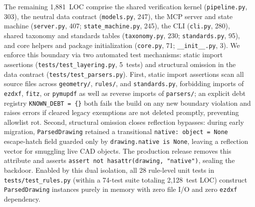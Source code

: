 \documentclass[nocopyright,nolists,upint,varvw,hyphenate]{asmejour}
\begin{document}
The remaining 1,881~LOC comprise the shared verification kernel (\texttt{pipeline.py}, 303), the neutral data contract (\texttt{models.py}, 247), the MCP server and state machine (\texttt{server.py}, 407; \texttt{state\_machine.py}, 245), the CLI (\texttt{cli.py}, 280), shared taxonomy and standards tables (\texttt{taxonomy.py}, 230; \texttt{standards.py}, 95), and core helpers and package initialization (\texttt{core.py}, 71; \texttt{\_\_init\_\_.py}, 3). We enforce this boundary via two automated test mechanisms: static import assertions (\texttt{tests/test\_layering.py}, 5~tests) and structural omission in the data contract (\texttt{tests/test\_parsers.py}). First, static import assertions scan all source files across \texttt{geometry/}, \texttt{rules/}, and \texttt{standards.py}, forbidding imports of \texttt{ezdxf}, \texttt{fitz}, or \texttt{pymupdf} as well as reverse imports of \texttt{parsers/}; an explicit debt registry \texttt{KNOWN\_DEBT = \{\}} both fails the build on any new boundary violation and raises errors if cleared legacy exemptions are not deleted promptly, preventing allowlist rot. Second, structural omission closes reflection bypasses: during early migration, \texttt{ParsedDrawing} retained a transitional \texttt{native: object = None} escape-hatch field guarded only by \texttt{drawing.native is None}, leaving a reflection vector for smuggling live CAD objects. The production release removes this attribute and asserts \texttt{assert not hasattr(drawing, "native")}, sealing the backdoor. Enabled by this dual isolation, all 28 rule-level unit tests in \texttt{tests/test\_rules.py} (within a 74-test suite totaling 2,128~test LOC) construct \texttt{ParsedDrawing} instances purely in memory with zero file I/O and zero \texttt{ezdxf} dependency.
\end{document}
